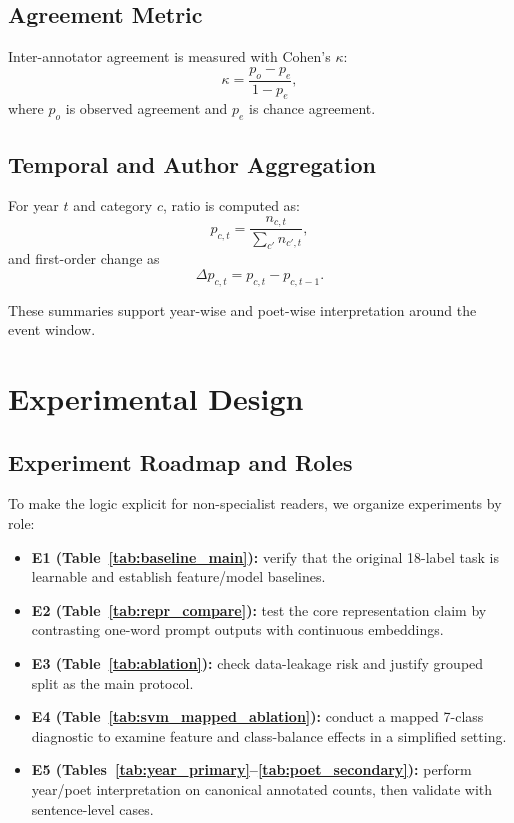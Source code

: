 \documentclass[11pt]{article}
\begin{document}
\subsection{Agreement Metric}

Inter-annotator agreement is measured with Cohen's \(\kappa\):
\begin{equation}
\kappa = \frac{p_o-p_e}{1-p_e},
\label{eq:kappa}
\end{equation}
where \(p_o\) is observed agreement and \(p_e\) is chance agreement.

\subsection{Temporal and Author Aggregation}

For year \(t\) and category \(c\), ratio is computed as:
\begin{equation}
p_{c,t}=\frac{n_{c,t}}{\sum_{c'} n_{c',t}},
\label{eq:ratio}
\end{equation}
and first-order change as
\begin{equation}
\Delta p_{c,t}=p_{c,t}-p_{c,t-1}.
\label{eq:delta}
\end{equation}

These summaries support year-wise and poet-wise interpretation around the event window.

\section{Experimental Design}

\subsection{Experiment Roadmap and Roles}

To make the logic explicit for non-specialist readers, we organize experiments by role:
\begin{itemize}
    \item \textbf{E1 (Table~\ref{tab:baseline_main}):} verify that the original 18-label task is learnable and establish feature/model baselines.
    \item \textbf{E2 (Table~\ref{tab:repr_compare}):} test the core representation claim by contrasting one-word prompt outputs with continuous embeddings.
    \item \textbf{E3 (Table~\ref{tab:ablation}):} check data-leakage risk and justify grouped split as the main protocol.
    \item \textbf{E4 (Table~\ref{tab:svm_mapped_ablation}):} conduct a mapped 7-class diagnostic to examine feature and class-balance effects in a simplified setting.
    \item \textbf{E5 (Tables~\ref{tab:year_primary}--\ref{tab:poet_secondary}):} perform year/poet interpretation on canonical annotated counts, then validate with sentence-level cases.
\end{itemize}
\end{document}
